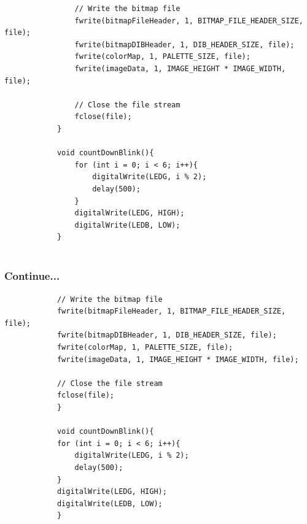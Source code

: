\documentclass[10pt, a4paper]{beamer}
\begin{document}
\begin{frame}[fragile]
\begin{lstlisting}
				// Write the bitmap file
				fwrite(bitmapFileHeader, 1, BITMAP_FILE_HEADER_SIZE, file);
				fwrite(bitmapDIBHeader, 1, DIB_HEADER_SIZE, file);
				fwrite(colorMap, 1, PALETTE_SIZE, file);
				fwrite(imageData, 1, IMAGE_HEIGHT * IMAGE_WIDTH, file);
				
				// Close the file stream
				fclose(file);
			}
			
			void countDownBlink(){
				for (int i = 0; i < 6; i++){
					digitalWrite(LEDG, i % 2);
					delay(500);
				}
				digitalWrite(LEDG, HIGH);
				digitalWrite(LEDB, LOW);
			}   
					
		\end{lstlisting}
	\end{frame}
		
	\begin{frame}[fragile]
		\frametitle{Continue...}
		\begin{lstlisting}
			// Write the bitmap file
			fwrite(bitmapFileHeader, 1, BITMAP_FILE_HEADER_SIZE, file);
			fwrite(bitmapDIBHeader, 1, DIB_HEADER_SIZE, file);
			fwrite(colorMap, 1, PALETTE_SIZE, file);
			fwrite(imageData, 1, IMAGE_HEIGHT * IMAGE_WIDTH, file);
			
			// Close the file stream
			fclose(file);
			}
			
			void countDownBlink(){
			for (int i = 0; i < 6; i++){
				digitalWrite(LEDG, i % 2);
				delay(500);
			}
			digitalWrite(LEDG, HIGH);
			digitalWrite(LEDB, LOW);
			} 
		\end{lstlisting}
	\end{frame}
	
\end{document}
